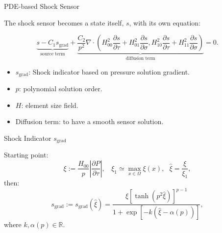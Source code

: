 \documentclass{beamer}
\newcounter{sectionframecount}
\begin{document}
\begin{frame}[t]{PDE-based Shock Sensor\footnotemark}

The shock sensor becomes a state itself, $s$, with its own equation:

\begin{equation}
  \underbrace{s - C_1s_{\text{grad}}}_{\text{source term}} + \underbrace{\dfrac{C_2}{p^2}\nabla \cdot \left(H^2_{00}\dfrac{\partial s}{\partial \tau} + H^2_{01}\dfrac{\partial s}{\partial \sigma},H^2_{10}\dfrac{\partial s}{\partial \tau}+H^2_{11}\dfrac{\partial s}{\partial \sigma}\right)}_{\text{diffusion term}} = 0.
	\label{e:sensor_source}
\end{equation}

\begin{itemize}
  \item $s_{\text{grad}}$: Shock indicator based on pressure solution gradient.
  \item $p$: polynomial solution order.
  \item $H$: element size field.
  \item Diffusion term: to have a smooth sensor solution.
\end{itemize}

\end{frame}


\begin{frame}[t]{Shock Indicator $s_{\text{grad}}$}

  Starting point:
  \begin{equation}
    \xi := \dfrac{H_{00}}{p} \left|\dfrac{\partial P}{\partial \tau}\right|,~~~~ \xi_1 \simeq \max_{x\in\Omega} \xi(x),~~~\hat{\xi} = \dfrac{\xi}{\xi_1},
  \end{equation}
  then:
  \begin{equation}
    s_\text{grad} := s_\text{grad}(\hat{\xi}) = \dfrac{\hat{\xi} [\tanh(p^2\hat{\xi})]^{p-1}}{1+\exp\left[-k \left(\hat{\xi} - \alpha(p)\right)\right]},
    \label{e:s_grad}
  \end{equation}
  where $k,\alpha(p) \in \mathbb{R}$.
  \end{frame}

\end{document}
